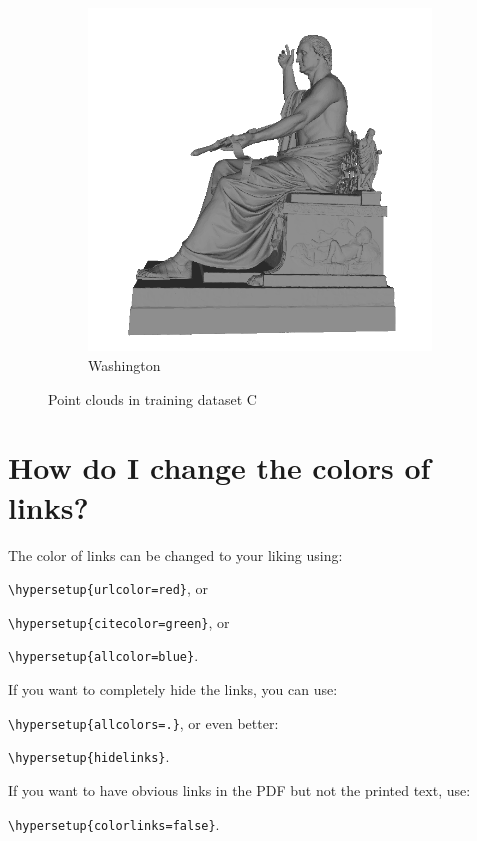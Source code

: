 \begin{figure}
\begin{subfigure}[b]{0.23\linewidth}
		\includegraphics[width=\linewidth]{./Figures/test-dataset/04.washington.png}
		\caption{Washington}
	\end{subfigure}
	\label{fig:dataset_c}
	\caption{Point clouds in training dataset C}
\end{figure}



\section{How do I change the colors of links?}

The color of links can be changed to your liking using:

{\small\verb!\hypersetup{urlcolor=red}!}, or

{\small\verb!\hypersetup{citecolor=green}!}, or

{\small\verb!\hypersetup{allcolor=blue}!}.

\noindent If you want to completely hide the links, you can use:

{\small\verb!\hypersetup{allcolors=.}!}, or even better: 

{\small\verb!\hypersetup{hidelinks}!}.

\noindent If you want to have obvious links in the PDF but not the printed text, use:

{\small\verb!\hypersetup{colorlinks=false}!}.
